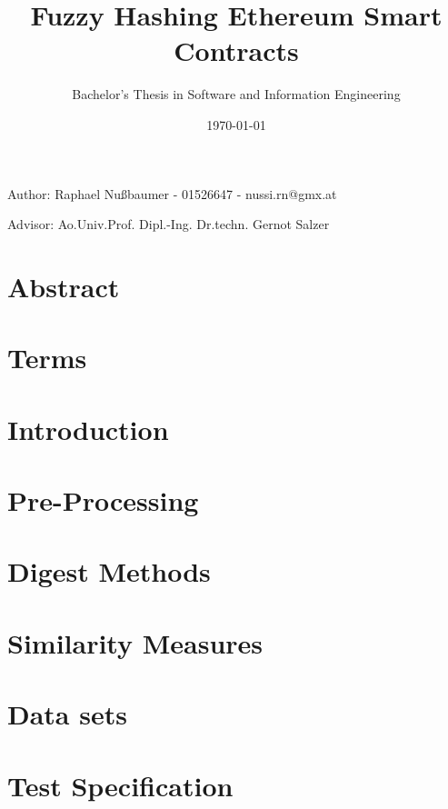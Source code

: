\documentclass[]{article}
\title{Fuzzy Hashing Ethereum Smart Contracts}
\author{Bachelor's Thesis in Software and Information Engineering}
\date{\today}
\begin{document}
\maketitle
\begin{center}
  Author: Raphael Nußbaumer - 01526647 - nussi.rn@gmx.at

  Advisor: Ao.Univ.Prof. Dipl.-Ing. Dr.techn. Gernot Salzer
\end{center}

\section{Abstract}



\section{Terms}


\section{Introduction}


\section{Pre-Processing}


\section{Digest Methods}


\section{Similarity Measures}


\section{Data sets}


\section{Test Specification}

\end{document}
